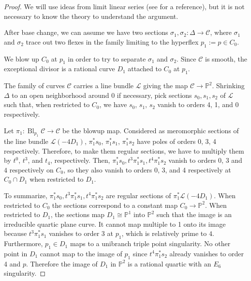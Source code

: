 \documentclass{article}
\theoremstyle{definition}
\newcommand{\on}{\operatorname}
\newcommand{\mb}{\mathbb}
\newcommand{\mc}{\mathcal}
\begin{document}
\begin{proof}
We will use ideas from limit linear series (see \cite{EH86} for a reference), but it is not necessary to know the theory to understand the argument.

After base change, we can assume we have two sections $\sigma_1,\sigma_2: \Delta\to \mc{C}$, where $\sigma_1$ and $\sigma_2$ trace out two flexes in the family limiting to the hyperflex $p_1:=p\in C_0$. 

We blow up $C_0$ at $p_1$ in order to try to separate $\sigma_1$ and $\sigma_2$. Since $\mc{C}$ is smooth, the exceptional divisor is a rational curve $D_1$ attached to $C_0$ at $p_1$. 

The family of curves $\mc{C}$ carries a line bundle $\mc{L}$ giving the map $\mc{C}\to \mb{P}^2$. Shrinking $\Delta$ to an open neighborhood around $0$ if necessary, pick sections $s_0,s_1,s_2$ of $\mc{L}$ such that, when restricted to $C_0$, we have $s_0$, $s_1$, $s_2$ vanish to orders 4, 1, and 0 respectively.

Let $\pi_1: \on{Bl}_{p_1}\mc{C}\to \mc{C}$ be the blowup map. Considered as meromorphic sections of the line bundle $\mc{L}(-4D_1)$, $\pi_1^{*}s_0$, $\pi_1^{*}s_1$, $\pi_1^{*}s_2$ have poles of orders 0, 3, 4 respectively. Therefore, to make them regular sections, we have to multiply them by $t^0$, $t^3$, and $t_4$, respectively. Then, $\pi_1^{*}s_0, t^3\pi_1^{*}s_1, t^4\pi_1^{*}s_2$ vanish to orders $0$, $3$ and $4$ respectively on $C_0$, so they also vanish to orders 0, 3, and 4 respectively at $C_0\cap D_1$ when restricted to $D_1$. 

To summarize, $\pi_1^{*}s_0, t^3\pi_1^{*}s_1, t^4\pi_1^{*}s_2$ are regular sections of $\pi_1^{*}\mc{L}(-4D_1)$. When restricted to $C_0$ the sections correspond to a constant map $C_0\to \mb{P}^2$. When restricted to $D_1$, the sections map $D_1\cong \mb{P}^1$ into $\mb{P}^2$ such that the image is an irreducible quartic plane curve. It cannot map multiple to 1 onto its image because $t^3\pi_1^{*}s_1$ vanishes to order 3 at $p_1$, which is relatively prime to $4$. Furthermore, $p_1\in D_1$ maps to a unibranch triple point singularity. No other point in $D_1$ cannot map to the image of $p_1$ since $t^4\pi_1^{*}s_2$ already vanishes to order 4 and $p$. Therefore the image of $D_1$ in $\mb{P}^2$ is a rational quartic with an $E_6$ singularity.


\end{proof}
\end{document}
